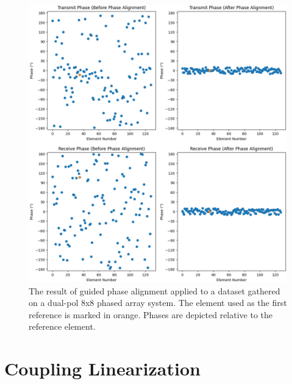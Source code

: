 \documentclass[journal]{IEEEtran}
\begin{document}
\begin{figure}
    \centering
    \includegraphics[width=1\linewidth]{bruteForcePAresults-dualpole.png}
    \caption{The result of guided phase alignment applied to a dataset gathered on a dual-pol 8x8 phased array system. The element used as the first reference is marked in orange. Phases are depicted relative to the reference element.}
    \label{fig:bruteforcePA}
\end{figure}



\section{Coupling Linearization}
\end{document}
